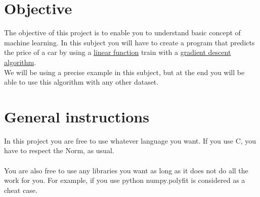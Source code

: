 \documentclass{42}
\begin{document}
\chapter{Objective}

	The objective of this project is to enable you to understand basic concept of machine learning. In this subject you will have to create a program that predicts the price of a car by using a \href{https://en.wikipedia.org/wiki/Linear\_function}{linear function} train with a \href{https://en.wikipedia.org/wiki/Gradient\_descent}{gradient descent algorithm}.\\ 
	We will be using a precise example in this subject, but at the end you will be able to use this algorithm with any other dataset.

\chapter{General instructions}

	In this project you are free to use whatever language you want. If you use C, you have to respect the Norm, as usual.\\\\

	You are also free to use any libraries you want as long as it does not do all the work for you. For example, if you use python numpy.polyfit is considered as a cheat case.\\\\


\end{document}
